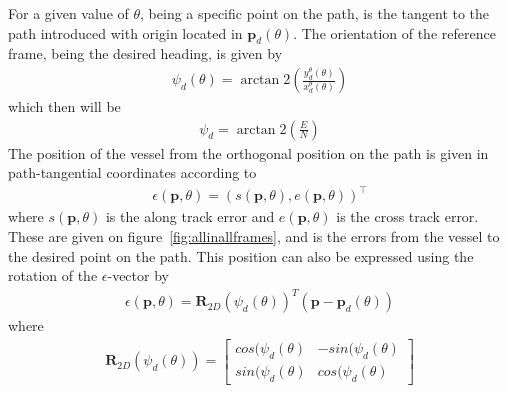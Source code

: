 For a given value of $\theta$, being a specific point on the path, is the tangent to the path introduced with origin located in $\textbf{p}_d(\theta)$. The orientation of the reference frame, being the desired heading, is given by
\begin{align}
\psi_d(\theta) = \arctan2\left(\frac{y_d^\theta(\theta)}{x_d^\theta(\theta)}\right)
\end{align}
which then will be
\begin{align}
\psi_d = \arctan2\left(\frac{E}{N}\right)
\end{align}
The position of the vessel from the orthogonal position on the path is given in path-tangential coordinates according to
\begin{align}
\epsilon(\textbf{p},\theta) = (s(\textbf{p},\theta),e(\textbf{p},\theta))^\top
\end{align}
where $s(\textbf{p},\theta)$ is the along track error and $e(\textbf{p},\theta)$ is the cross track error. These are given on figure~\vref{fig:allinallframes}, and is the errors from the vessel to the desired point on the path. This position can also be expressed using the rotation of the $\epsilon$-vector by
\begin{align}
\epsilon(\textbf{p},\theta) = \textbf{R}_{2D}(\psi_d(\theta))^T(\textbf{p}-\textbf{p}_d(\theta))
\end{align}
where
\begin{align}
\textbf{R}_{2D}(\psi_d(\theta)) = 
\begin{bmatrix}
cos(\psi_d(\theta) & -sin(\psi_d(\theta)\\
sin(\psi_d(\theta) & cos(\psi_d(\theta)
\end{bmatrix}
\end{align}
